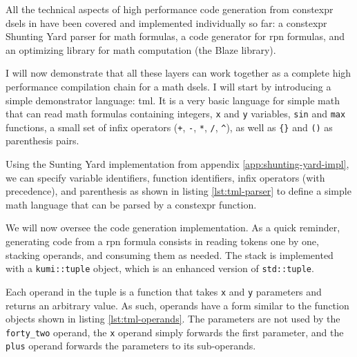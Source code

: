 \documentclass[../main]{subfiles}
\begin{document}
All the technical aspects of high performance code generation from
\gls{constexpr} \glspl{dsel} in  have been covered and implemented
individually so far:
a \gls{constexpr} Shunting Yard parser for math formulas,
a code generator for \gls{rpn} formulas,
and an optimizing library for math computation (the Blaze library).

I will now demonstrate that all these layers can work together
as a complete high performance compilation chain for a math \glspl{dsel}.
I will start by introducing a simple demonstrator language: \gls{tml}.
It is a very basic language for simple math that can read math formulas
containing integers, \lstinline{x} and \lstinline{y} variables,
\lstinline{sin} and \lstinline{max} functions, a small set of infix operators
(\lstinline{+}, \lstinline{-}, \lstinline{*}, \lstinline{/}, \lstinline{^}),
as well as \lstinline|{}| and \lstinline{()} as parenthesis pairs.

Using the Sunting Yard implementation from
appendix \ref{app:shunting-yard-impl}, we can specify variable identifiers,
function identifiers, infix operators (with precedence), and parenthesis
as shown in listing \ref{lst:tml-parser} to define a simple math language
that can be parsed by a \gls{constexpr} function.

We will now oversee the code generation implementation.
As a quick reminder, generating code from a \gls{rpn} formula
consists in reading tokens one by one, stacking operands, and consuming
them as needed. The stack is implemented with a \lstinline{kumi::tuple} object,
which is an enhanced version of \lstinline{std::tuple}.

Each operand in the tuple is a function that takes \lstinline{x} and
\lstinline{y} parameters and returns an arbitrary value.
As such, operands have a form similar to the function
objects shown in listing \ref{lst:tml-operands}.
The parameters are not used by the \lstinline{forty_two} operand,
the \lstinline{x} operand simply forwards the first parameter,
and the \lstinline{plus} operand forwards the parameters to its sub-operands.

\clearpage%
\end{document}
